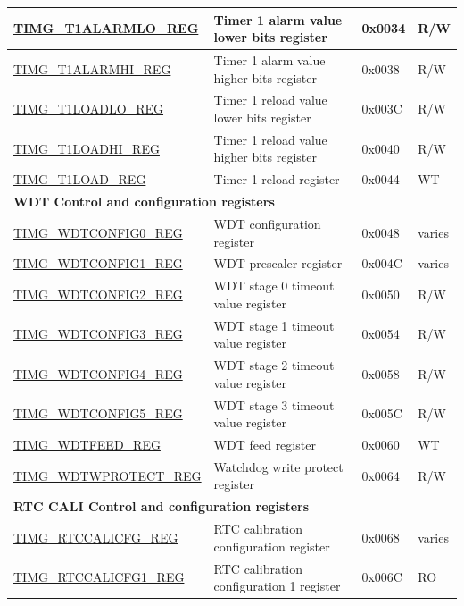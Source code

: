\begin{longtable}{ | p{5.1cm} | p{7.5cm} | p{1.3cm} | p{1.4cm} | }
    \hyperref[regdesc:TIMGTXALARMLOREG]{TIMG\_T1ALARMLO\_REG} & Timer 1 alarm value lower bits register & 0x0034 & R/W \\ \hline
    \hyperref[regdesc:TIMGTXALARMHIREG]{TIMG\_T1ALARMHI\_REG} & Timer 1 alarm value higher bits register & 0x0038 & R/W \\ \hline
    \hyperref[regdesc:TIMGTXLOADLOREG]{TIMG\_T1LOADLO\_REG} & Timer 1 reload value lower bits register & 0x003C & R/W \\ \hline
    \hyperref[regdesc:TIMGTXLOADHIREG]{TIMG\_T1LOADHI\_REG} & Timer 1 reload value higher bits register & 0x0040 & R/W \\ \hline
    \hyperref[regdesc:TIMGTXLOADREG]{TIMG\_T1LOAD\_REG} & Timer 1 reload register & 0x0044 & WT \\ \hline
    \multicolumn{4}{|l|}{\textbf{WDT Control and configuration registers}} \\ \hline
    \hyperref[regdesc:TIMGWDTCONFIG0REG]{TIMG\_WDTCONFIG0\_REG} & WDT configuration register & 0x0048 & varies \\ \hline
    \hyperref[regdesc:TIMGWDTCONFIG1REG]{TIMG\_WDTCONFIG1\_REG} & WDT prescaler register & 0x004C & varies \\ \hline
    \hyperref[regdesc:TIMGWDTCONFIG2REG]{TIMG\_WDTCONFIG2\_REG} & WDT stage 0 timeout value register & 0x0050 & R/W \\ \hline
    \hyperref[regdesc:TIMGWDTCONFIG3REG]{TIMG\_WDTCONFIG3\_REG} & WDT stage 1 timeout value register & 0x0054 & R/W \\ \hline
    \hyperref[regdesc:TIMGWDTCONFIG4REG]{TIMG\_WDTCONFIG4\_REG} & WDT stage 2 timeout value register & 0x0058 & R/W \\ \hline
    \hyperref[regdesc:TIMGWDTCONFIG5REG]{TIMG\_WDTCONFIG5\_REG} & WDT stage 3 timeout value register & 0x005C & R/W \\ \hline
    \hyperref[regdesc:TIMGWDTFEEDREG]{TIMG\_WDTFEED\_REG} & WDT feed register & 0x0060 & WT \\ \hline
    \hyperref[regdesc:TIMGWDTWPROTECTREG]{TIMG\_WDTWPROTECT\_REG} & Watchdog write protect register & 0x0064 & R/W \\ \hline
    \multicolumn{4}{|l|}{\textbf{RTC CALI Control and configuration registers}} \\ \hline
    \hyperref[regdesc:TIMGRTCCALICFGREG]{TIMG\_RTCCALICFG\_REG} & RTC calibration configuration register & 0x0068 & varies \\ \hline
    \hyperref[regdesc:TIMGRTCCALICFG1REG]{TIMG\_RTCCALICFG1\_REG} & RTC calibration configuration 1 register & 0x006C & RO \\ \hline

\end{longtable}
